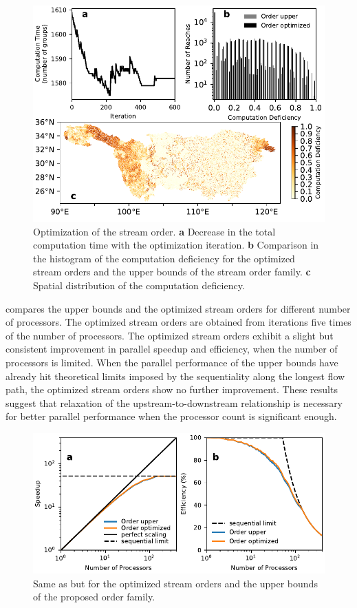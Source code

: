 \documentclass[water,article,submit,pdftex,moreauthors]{Definitions/mdpi}
\begin{document}
\begin{figure}[H]
	\includegraphics[width=13.5 cm]{fig/optimization_iteration_yangtze.pdf}
	\caption{Optimization of the stream order. \textbf{a} Decrease in the total computation time with the optimization iteration. \textbf{b} Comparison in the histogram of the computation deficiency for the optimized stream orders and the upper bounds of the stream order family. \textbf{c} Spatial distribution of the computation deficiency. \label{fig:optimization_iteration_yangtze}}
\end{figure}

 compares the upper bounds and the optimized stream orders for different number of processors. The optimized stream orders are obtained from iterations five times of the number of processors. The optimized stream orders exhibit a slight but consistent improvement in parallel speedup and efficiency, when the number of processors is limited. When the parallel performance of the upper bounds have already hit theoretical limits imposed by the sequentiality along the longest flow path, the optimized stream orders show no further improvement. These results suggest that relaxation of the upstream-to-downstream relationship is necessary for better parallel performance when the processor count is significant enough.

\begin{figure}[H]
	\includegraphics[width=12.5 cm]{fig/speedup_opt_yangtze.pdf}
	\caption{Same as  but for the optimized stream orders and the upper bounds of the proposed order family. \label{fig:order_optmization_yangtze}}
\end{figure}
\end{document}

